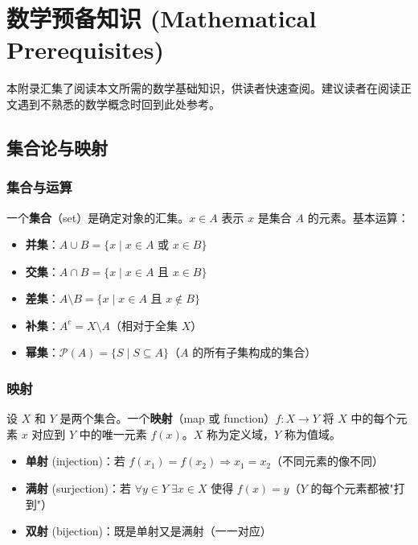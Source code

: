 \chapter{数学预备知识 (Mathematical Prerequisites)}

本附录汇集了阅读本文所需的数学基础知识，供读者快速查阅。建议读者在阅读正文遇到不熟悉的数学概念时回到此处参考。

\section{集合论与映射}

\subsection{集合与运算}

一个\textbf{集合}（set）是确定对象的汇集。$x \in A$ 表示 $x$ 是集合 $A$ 的元素。基本运算：
\begin{itemize}
    \item \textbf{并集}：$A \cup B = \{x \mid x \in A \text{ 或 } x \in B\}$
    \item \textbf{交集}：$A \cap B = \{x \mid x \in A \text{ 且 } x \in B\}$
    \item \textbf{差集}：$A \setminus B = \{x \mid x \in A \text{ 且 } x \notin B\}$
    \item \textbf{补集}：$A^c = X \setminus A$（相对于全集 $X$）
    \item \textbf{幂集}：$\mathcal{P}(A) = \{S \mid S \subseteq A\}$（$A$ 的所有子集构成的集合）
\end{itemize}

\subsection{映射}

设 $X$ 和 $Y$ 是两个集合。一个\textbf{映射}（map 或 function）$f: X \to Y$ 将 $X$ 中的每个元素 $x$ 对应到 $Y$ 中的唯一元素 $f(x)$。$X$ 称为定义域，$Y$ 称为值域。

\begin{itemize}
    \item \textbf{单射} (injection)：若 $f(x_1) = f(x_2) \Rightarrow x_1 = x_2$（不同元素的像不同）
    \item \textbf{满射} (surjection)：若 $\forall y \in Y \; \exists x \in X$ 使得 $f(x) = y$（$Y$ 的每个元素都被"打到"）
    \item \textbf{双射} (bijection)：既是单射又是满射（一一对应）
\end{itemize}

